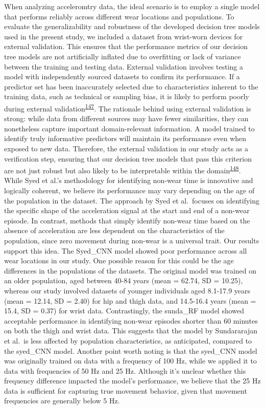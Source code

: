 \documentclass[
  10pt,
]{scrbook}
\begin{document}
When analyzing acceleromtry data, the ideal scenario is to employ a
single model that performs reliably across different wear locations and
populations. To evaluate the generalizability and robustness of the
developed decision tree models used in the present study, we included a
dataset from wrist-worn devices for external validation. This ensures
that the performance metrics of our decision tree models are not
artificially inflated due to overfitting or lack of variance between the
training and testing data. External validation involves testing a model
with independently sourced datasets to confirm its performance. If a
predictor set has been inaccurately selected due to characteristics
inherent to the training data, such as technical or sampling bias, it is
likely to perform poorly during external
validation\textsuperscript{\protect\hyperlink{ref-steyerberg_prediction_2016}{147}}.
The rationale behind using external validation is strong: while data
from different sources may have fewer similarities, they can nonetheless
capture important domain-relevant information. A model trained to
identify truly informative predictors will maintain its performance even
when exposed to new data. Therefore, the external validation in our
study acts as a verification step, ensuring that our decision tree
models that pass this criterion are not just robust but also likely to
be interpretable within the
domain\textsuperscript{\protect\hyperlink{ref-altman_prognosis_2009}{148}}.
While Syed et al.'s methodology for identifying non-wear time is
innovative and logically coherent, we believe its performance may vary
depending on the age of the population in the dataset. The approach by
Syed et al.~focuses on identifying the specific shape of the
acceleration signal at the start and end of a non-wear episode. In
contrast, methods that simply identify non-wear time based on the
absence of acceleration are less dependent on the characteristics of the
population, since zero movement during non-wear is a universal trait.
Our results support this idea. The Syed\_CNN model showed poor
performance across all wear locations in our study. One possible reason
for this could be the age differences in the populations of the
datasets. The original model was trained on an older population, aged
between 40-84 years (mean = 62.74, SD = 10.25), whereas our study
involved datasets of younger individuals aged 8.1-17.9 years (mean =
12.14, SD = 2.40) for hip and thigh data, and 14.5-16.4 years (mean =
15.4, SD = 0.37) for wrist data. Contrastingly, the sunda\_RF model
showed acceptable performance in identifying non-wear episodes shorter
than 60 minutes on both the thigh and wrist data. This suggests that the
model by Sundararajan et al.~is less affected by population
characteristics, as anticipated, compared to the syed\_CNN model.
Another point worth noting is that the syed\_CNN model was originally
trained on data with a frequency of 100 Hz, while we applied it to data
with frequencies of 50 Hz and 25 Hz. Although it's unclear whether this
frequency difference impacted the model's performance, we believe that
the 25 Hz data is sufficient for capturing true movement behavior, given
that movement frequencies are generally below 5 Hz.
\end{document}
